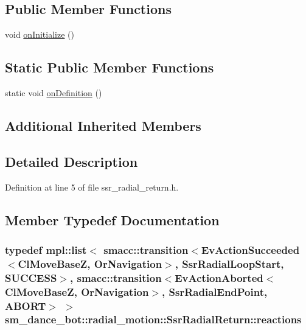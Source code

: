 \subsection*{Public Member Functions}
\begin{DoxyCompactItemize}
\item 
void \hyperlink{structsm__dance__bot_1_1radial__motion_1_1SsrRadialReturn_a4c43f8cfa8760c28743754acf7fba273}{on\+Initialize} ()
\end{DoxyCompactItemize}
\subsection*{Static Public Member Functions}
\begin{DoxyCompactItemize}
\item 
static void \hyperlink{structsm__dance__bot_1_1radial__motion_1_1SsrRadialReturn_afba35061edf9524d392643f4589912b2}{on\+Definition} ()
\end{DoxyCompactItemize}
\subsection*{Additional Inherited Members}


\subsection{Detailed Description}


Definition at line 5 of file ssr\+\_\+radial\+\_\+return.\+h.



\subsection{Member Typedef Documentation}
\subsubsection[{\texorpdfstring{reactions}{reactions}}]{\setlength{\rightskip}{0pt plus 5cm}typedef mpl\+::list$<$ {\bf smacc\+::transition}$<$Ev\+Action\+Succeeded$<${\bf Cl\+Move\+BaseZ}, {\bf Or\+Navigation}$>$, {\bf Ssr\+Radial\+Loop\+Start}, {\bf S\+U\+C\+C\+E\+SS}$>$, {\bf smacc\+::transition}$<$Ev\+Action\+Aborted$<${\bf Cl\+Move\+BaseZ}, {\bf Or\+Navigation}$>$, {\bf Ssr\+Radial\+End\+Point}, {\bf A\+B\+O\+RT}$>$ $>$ {\bf sm\+\_\+dance\+\_\+bot\+::radial\+\_\+motion\+::\+Ssr\+Radial\+Return\+::reactions}}\hypertarget{structsm__dance__bot_1_1radial__motion_1_1SsrRadialReturn_a8e7b5d74ffc81873d1e8d7b95e54d626}{}\label{structsm__dance__bot_1_1radial__motion_1_1SsrRadialReturn_a8e7b5d74ffc81873d1e8d7b95e54d626}


